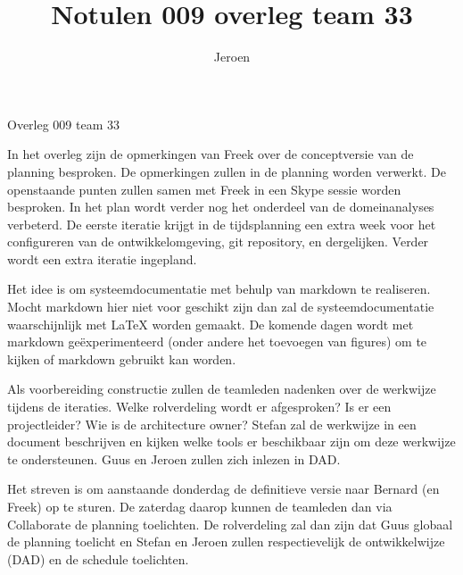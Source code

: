 \documentclass{article}
\title{Notulen 009 overleg team 33}
\author{Jeroen}
\begin{document}

\begin{Minutes}{Overleg 009 team 33}

\maketitle%


In het overleg zijn de opmerkingen van Freek over de conceptversie van de planning
besproken. De opmerkingen zullen in de planning worden verwerkt. De
openstaande punten zullen samen met Freek in een Skype sessie worden besproken.
In het plan wordt verder nog het onderdeel van de domeinanalyses verbeterd. De
eerste iteratie krijgt in de tijdsplanning een extra week voor het configureren
van de ontwikkelomgeving, git repository, en dergelijken. Verder wordt een extra
iteratie ingepland.


Het idee is om systeemdocumentatie met behulp van markdown te realiseren. Mocht markdown
hier niet voor geschikt zijn dan zal de systeemdocumentatie waarschijnlijk met LaTeX
worden gemaakt. De komende dagen wordt met markdown ge\"experimenteerd (onder andere
het toevoegen van figures) om te kijken of markdown gebruikt kan worden.


Als voorbereiding constructie zullen de teamleden nadenken over de werkwijze tijdens
de iteraties. Welke rolverdeling wordt er afgesproken? Is er een projectleider?
Wie is de architecture owner? Stefan zal de werkwijze in een document beschrijven en
kijken welke tools er beschikbaar zijn om deze werkwijze te ondersteunen. Guus en
Jeroen zullen zich inlezen in DAD.


Het streven is om aanstaande donderdag de definitieve versie naar Bernard (en Freek)
op te sturen. De zaterdag daarop kunnen de teamleden dan via Collaborate de planning
toelichten. De rolverdeling zal dan zijn dat Guus globaal de planning toelicht en
Stefan en Jeroen zullen respectievelijk de ontwikkelwijze (DAD) en de schedule toelichten.





\end{Minutes}
\end{document}
